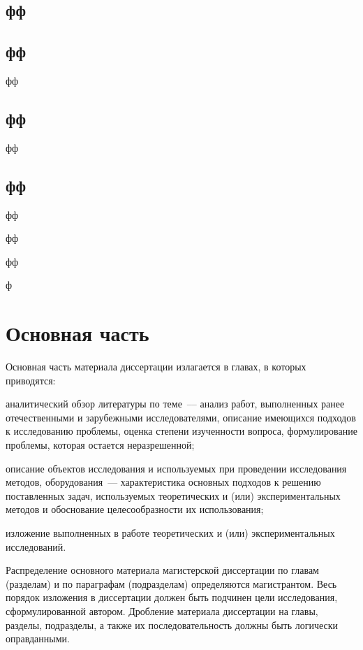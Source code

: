 \documentclass{mpaper}
\begin{document}
    \section{фф}

    \section{фф}

    фф

    \section{фф}

    фф

    \section{фф}

    фф

    фф

    фф

    ф

    \chapter{Основная часть}
    Основная часть материала диссертации излагается в главах, в которых приводятся:

    аналитический обзор литературы по теме~--– анализ работ, выполненных ранее отечественными и зарубежными исследователями, описание имеющихся подходов к исследованию проблемы, оценка степени изученности вопроса, формулирование проблемы, которая остается неразрешенной;

    описание объектов исследования и используемых при проведении исследования методов, оборудования~--- характеристика основных подходов к решению поставленных задач, используемых теоретических и (или) экспериментальных методов и обоснование целесообразности их использования;

    изложение выполненных в работе теоретических и (или) экспериментальных исследований.

    Распределение основного материала магистерской диссертации по главам (разделам) и по параграфам (подразделам) определяются магистрантом. Весь порядок изложения в диссертации должен быть подчинен цели исследования, сформулированной автором. Дробление материала диссертации на главы, разделы, подразделы, а также их
    последовательность должны быть логически оправданными.
\end{document}
